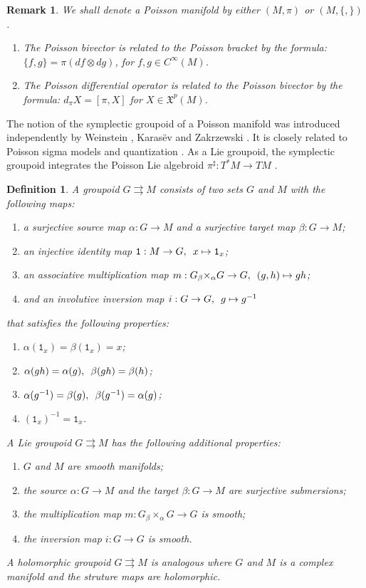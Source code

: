 \documentclass{amsart}
\newtheorem{definition}[theorem]{Definition}
\newtheorem{remark}[theorem]{Remark}
\begin{document}
\begin{remark}
	We shall denote a Poisson manifold by either $(M, \pi)$ or $(M, \{,\})$.
	\begin{enumerate}
		\item The Poisson bivector is related to the Poisson bracket by the formula: $\{f, g\} = \pi (df \otimes dg)$, for $f, g\in C^\infty(M)$.
		\item The Poisson differential operator is related to the Poisson bivector by the formula: $d_\pi X = [\pi, X]$ for $X \in \mathfrak{X}^p(M)$.
	\end{enumerate}
\end{remark}

The notion of the symplectic groupoid of a Poisson manifold was introduced independently by Weinstein \cite{MR866024}, Karas\"{e}v \cite{MR1008479} and Zakrzewski \cite{MR1081010, MR1081011}. It is closely related to Poisson sigma models \cite{MR1938552} and quantization \cite{MR2417440}. As a Lie groupoid, the symplectic groupoid integrates the Poisson Lie algebroid $\pi^\sharp: T^*M \to TM$ \cite{MR866024}.

\begin{definition}
A groupoid $G \rightrightarrows M$ consists of two sets $G$ and $M$ with the following maps:
	\begin{enumerate}
		\item a surjective source map $\alpha: G \to M$ and a surjective target map $\beta: G \to M$;
		\item an injective identity map $\mathtt{1}: M \to G, \enskip x \mapsto \mathtt{1}_x$;
		\item an associative multiplication map $m: G {_\beta \times_\alpha} G \to G, \enskip (g, h) \mapsto gh$;
		\item and an involutive inversion map $i: G \to G, \enskip g \mapsto g^{-1}$
	\end{enumerate}
that satisfies the following properties:
	\begin{enumerate}
		\item $\alpha(\mathtt{1}_x) = \beta(\mathtt{1}_x) = x$;
		\item $\alpha(gh) = \alpha(g), \enskip \beta(gh) = \beta(h)$;
		\item $\alpha(g^{-1}) = \beta(g), \enskip \beta(g^{-1}) = \alpha(g)$;
		\item $(\mathtt{1}_x)^{-1} = \mathtt{1}_x$.
	\end{enumerate}
A Lie groupoid $G \rightrightarrows M$ has the following additional properties:
	\begin{enumerate}
		\item $G$ and $M$ are smooth manifolds;
		\item the source $\alpha: G \to M$ and the target $\beta: G \to M$ are surjective submersions;
		\item the multiplication map $m: G {_\beta \times_\alpha} G \to G$ is smooth;
		\item the inversion map $i: G \to G$ is smooth.
	\end{enumerate}
A holomorphic groupoid $G \rightrightarrows M$ is analogous where $G$ and $M$ is a complex manifold and the struture maps are holomorphic.
\end{definition}
\end{document}
